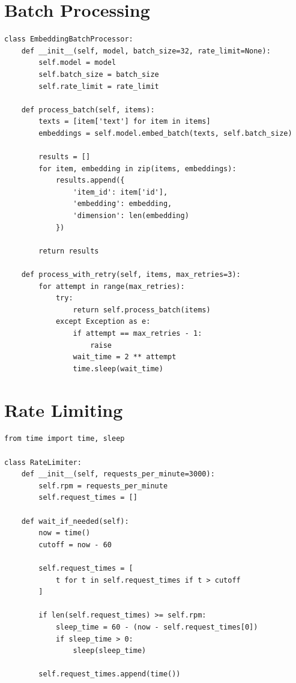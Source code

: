 \documentclass[12pt,a4paper]{report}
\begin{document}
\section{Batch Processing}

\begin{lstlisting}
class EmbeddingBatchProcessor:
    def __init__(self, model, batch_size=32, rate_limit=None):
        self.model = model
        self.batch_size = batch_size
        self.rate_limit = rate_limit
    
    def process_batch(self, items):
        texts = [item['text'] for item in items]
        embeddings = self.model.embed_batch(texts, self.batch_size)
        
        results = []
        for item, embedding in zip(items, embeddings):
            results.append({
                'item_id': item['id'],
                'embedding': embedding,
                'dimension': len(embedding)
            })
        
        return results
    
    def process_with_retry(self, items, max_retries=3):
        for attempt in range(max_retries):
            try:
                return self.process_batch(items)
            except Exception as e:
                if attempt == max_retries - 1:
                    raise
                wait_time = 2 ** attempt
                time.sleep(wait_time)
\end{lstlisting}

\section{Rate Limiting}

\begin{lstlisting}
from time import time, sleep

class RateLimiter:
    def __init__(self, requests_per_minute=3000):
        self.rpm = requests_per_minute
        self.request_times = []
    
    def wait_if_needed(self):
        now = time()
        cutoff = now - 60
        
        self.request_times = [
            t for t in self.request_times if t > cutoff
        ]
        
        if len(self.request_times) >= self.rpm:
            sleep_time = 60 - (now - self.request_times[0])
            if sleep_time > 0:
                sleep(sleep_time)
        
        self.request_times.append(time())
\end{lstlisting}
\end{document}
